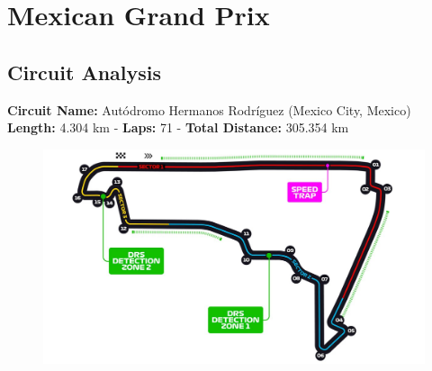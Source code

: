 \section{Mexican Grand Prix}

\subsection{Circuit Analysis}

\textbf{Circuit Name:} Autódromo Hermanos Rodríguez (Mexico City, Mexico) \\
\textbf{Length:} 4.304 km - \textbf{Laps:} 71 - \textbf{Total Distance:} 305.354 km

\begin{figure}[H]
    \centering
    \includegraphics[width=0.75\linewidth]{images/20.Mexico_Circuit.jpg}
\end{figure}

